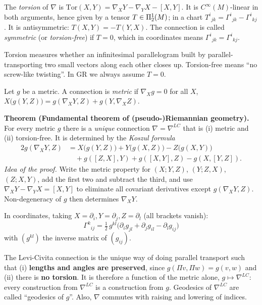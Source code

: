 \begin{formal}[{torsion}]
The \emph{torsion} of $\nabla$ is $\mathrm{Tor}(X,Y)=\nabla_XY-\nabla_YX-[X,Y]$. It is $C^\infty(M)$-linear in both arguments, hence given by a tensor $T\in\Pi^{1}_{2}(M)$; in a chart $T^i{}_{jk}=\Gamma^i{}_{jk}-\Gamma^i{}_{kj}$. It is antisymmetric: $T(X,Y)=-T(Y,X)$. The connection is called \emph{symmetric} (or \emph{torsion-free}) if $T=0$, which in coordinates means $\Gamma^i{}_{jk}=\Gamma^i{}_{kj}$.
\end{formal}
\begin{intuition}[{torsion = twisting of the frames}]
Torsion measures whether an infinitesimal parallelogram built by parallel-transporting two small vectors along each other closes up. Torsion-free means ``no screw-like twisting''. In GR we always assume $T=0$.
\end{intuition}

\begin{formal}
Let $g$ be a metric. A connection is \emph{metric} if $\nabla_Xg=0$ for all $X$, \ie $X\big(g(Y,Z)\big)=g(\nabla_XY,Z)+g(Y,\nabla_XZ)$.

\textbf{Theorem (Fundamental theorem of (pseudo-)Riemannian geometry).} For every metric $g$ there is a \emph{unique} connection $\nabla=\nabla^{LC}$ that is (i) metric and (ii) torsion-free. It is determined by the \emph{Koszul formula}
\begin{align*}
2g(\nabla_XY,Z)&=X\big(g(Y,Z)\big)+Y\big(g(X,Z)\big)-Z\big(g(X,Y)\big)\\
&\quad+g([Z,X],Y)+g([X,Y],Z)-g(X,[Y,Z]).
\end{align*}
\emph{Idea of the proof.} Write the metric property for $(X;Y,Z)$, $(Y;Z,X)$, $(Z;X,Y)$, add the first two and subtract the third, and use $\nabla_XY-\nabla_YX=[X,Y]$ to eliminate all covariant derivatives except $g(\nabla_XY,Z)$. Non-degeneracy of $g$ then determines $\nabla_XY$.

In coordinates, taking $X=\partial_i,Y=\partial_j,Z=\partial_l$ (all brackets vanish):
\begin{equation}\label{eq:christmetric}
\boxed{\ \Gamma^k{}_{ij}=\tfrac12\,g^{kl}\big(\partial_ig_{jl}+\partial_jg_{il}-\partial_lg_{ij}\big)\ }
\end{equation}
with $(g^{kl})$ the inverse matrix of $(g_{ij})$.
\end{formal}
\begin{intuition}
The Levi-Civita connection is the unique way of doing parallel transport such that (i) \textbf{lengths and angles are preserved}, since $g(\Pi v,\Pi w)=g(v,w)$ and (ii) there is \textbf{no torsion}. It is therefore a function of the metric alone, $g\mapsto\nabla^{LC}$: every construction from $\nabla^{LC}$ is a construction from $g$. Geodesics of $\nabla^{LC}$ are called ``geodesics of $g$''. Also, $\nabla$ commutes with raising and lowering of indices.
\end{intuition}

